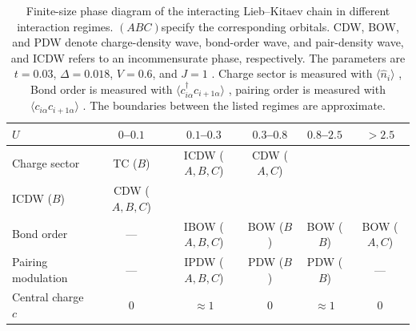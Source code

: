 \documentclass[
  prb,
  reprint,
  superscriptaddress,
  amsmath,
  amssymb,
  longbibliography
]{revtex4-2}
\begin{document}
\begin{table}[t]
    \centering
    \begingroup
    \small
    \renewcommand{\arraystretch}{1.5}
    \begin{tabular*}{\textwidth}{@{\extracolsep{\fill}}lccccc@{}}
    \hline\hline
    $U$
    & $0$--$0.1$
    & $0.1$--$0.3$
    & $0.3$--$0.8$
    & $0.8$--$2.5$
    & $>2.5$ \\
    \hline
    Charge sector
    & TC ($B$)
    & ICDW ($A,B,C$)
    & CDW ($A,C$)
    & \begin{tabular}{@{}c@{}}
        CDW ($A,C$) \\
        ICDW ($B$)
      \end{tabular}
    & CDW ($A,B,C$) \\

    Bond order
    & ---
    & IBOW ($A,B,C$)
    & BOW ($B$)
    & BOW ($B$)
    & BOW ($A,C$) \\

    Pairing modulation
    & ---
    & IPDW ($A,B,C$)
    & PDW ($B$)
    & PDW ($B$)
    & --- \\

    Central charge $c$
    & $0$
    & $\approx 1$
    & $0$
    & $\approx 1$
    & $0$ \\
    \hline\hline
    \end{tabular*}
    \endgroup
    \caption{
    Finite-size phase diagram of the interacting
    Lieb--Kitaev chain in different interaction regimes.  $(A B C)$specify the corresponding orbitals. CDW, BOW, and PDW denote charge-density wave, bond-order
    wave, and pair-density wave, and ICDW refers to an incommensurate phase, respectively. The parameters are $t=0.03$, $\Delta=0.018$, $V=0.6$,
    and  $J=1$ . Charge sector is measured with $\langle \hat{n}_i \rangle$ , Bond order is measured with $\langle c^{\dagger}_{i\alpha} c_{i+1 \alpha}\rangle$ , pairing order is measured with $\langle c_{i \alpha} c_{i+1 \alpha}\rangle$ . 
    The boundaries between the listed regimes are approximate.   
    }
    \label{tab:phase_summary}
\end{table}
\end{document}
